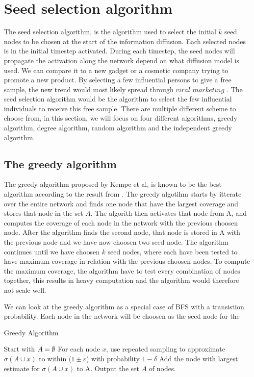 {\section{Seed selection algorithm}
The seed selection algorithm, is the algorithm used to select the initial $k$ seed nodes to be chosen at the start of the information diffusion. Each selected nodes is in the initial timestep activated. During each timestep, the seed nodes will propagate the activation along the network depend on what diffusion model is used. We can compare it to a new gadget or a cosmetic company trying to promote a new product. By selecting a few influential persons to give a free sample, the new trend would most likely  spread through $viral$ $marketing$ \cite{ViralMarketing}. The seed selection algorithm would be the algorithm to select the few influential individuals to receive this free sample. There are multiple different scheme to choose from, in this section, we will focus on four different algorithms, greedy algorithm, degree algorithm, random algorithm and the independent greedy algorithm.

\subsection{The greedy algorithm}
The greedy algorithm \cite{greedyInfluenc2005} proposed by Kempe et al, is known to be the best algorithm according to the result from  \cite{greedyInfluenc2005}. The greedy algotihm starts by itterate over the entire network and finds one node that have the largest coverage and stores that node in the set $A$. The algorith then activates that node from A, and computes the coverage of each node in the network with the previous choosen node. After the algorithm finds the second node, that node is stored in A with the previous node and we have now choosen two seed node. The algorithm continues until we have choosen $k$ seed nodes, where each have been tested to have maximum coverage in relation with the previous choosen nodes. To compute the maximum coverage, the algorithm have to test every combination of nodes together, this results in heavy computation and the algorithm would therefore not scale well.

We can look at the greedy algorithm as a special case of BFS with a transistion probability. Each node in the network will be choosen as the seed node for the

 \begin{algorithm}
\caption{Greedy Algorithm}
\begin{algorithmic}[1]
\State Start with $A = \emptyset$
\State For each node $x$, use repeated sampling to approximate $\sigma(A \cup {x}) $ to within ($1 \pm \varepsilon$) with probability
$1 − \delta$
\State Add the node with largest estimate for $\sigma(A \cup {x})$ to A.
\EndWhile
\State Output the set $A$ of nodes.
\end{algorithmic}
\end{algorithm}

}
